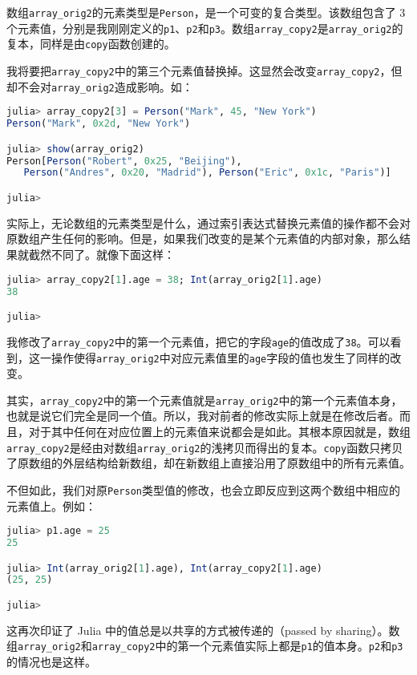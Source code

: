 数组\verb`array_orig2`的元素类型是\verb`Person`，是一个可变的复合类型。该数组包含了 3 个元素值，分别是我刚刚定义的\verb`p1`、\verb`p2`和\verb`p3`。数组\verb`array_copy2`是\verb`array_orig2`的复本，同样是由\verb`copy`函数创建的。

我将要把\verb`array_copy2`中的第三个元素值替换掉。这显然会改变\verb`array_copy2`，但却不会对\verb`array_orig2`造成影响。如：

\begin{lstlisting}[language=julia]
julia> array_copy2[3] = Person("Mark", 45, "New York")
Person("Mark", 0x2d, "New York")

julia> show(array_orig2)
Person[Person("Robert", 0x25, "Beijing"),
   Person("Andres", 0x20, "Madrid"), Person("Eric", 0x1c, "Paris")]

julia> 
\end{lstlisting}

实际上，无论数组的元素类型是什么，通过索引表达式替换元素值的操作都不会对原数组产生任何的影响。但是，如果我们改变的是某个元素值的内部对象，那么结果就截然不同了。就像下面这样：

\begin{lstlisting}[language=julia]
julia> array_copy2[1].age = 38; Int(array_orig2[1].age)
38

julia> 
\end{lstlisting}

我修改了\verb`array_copy2`中的第一个元素值，把它的字段\verb`age`的值改成了\verb`38`。可以看到，这一操作使得\verb`array_orig2`中对应元素值里的\verb`age`字段的值也发生了同样的改变。

其实，\verb`array_copy2`中的第一个元素值就是\verb`array_orig2`中的第一个元素值本身，也就是说它们完全是同一个值。所以，我对前者的修改实际上就是在修改后者。而且，对于其中任何在对应位置上的元素值来说都会是如此。其根本原因就是，数组\verb`array_copy2`是经由对数组\verb`array_orig2`的浅拷贝而得出的复本。\verb`copy`函数只拷贝了原数组的外层结构给新数组，却在新数组上直接沿用了原数组中的所有元素值。

不但如此，我们对原\verb`Person`类型值的修改，也会立即反应到这两个数组中相应的元素值上。例如：

\begin{lstlisting}[language=julia]
julia> p1.age = 25
25

julia> Int(array_orig2[1].age), Int(array_copy2[1].age)
(25, 25)

julia> 
\end{lstlisting}

这再次印证了 Julia 中的值总是以共享的方式被传递的（passed by sharing）。数组\verb`array_orig2`和\verb`array_copy2`中的第一个元素值实际上都是\verb`p1`的值本身。\verb`p2`和\verb`p3`的情况也是这样。

